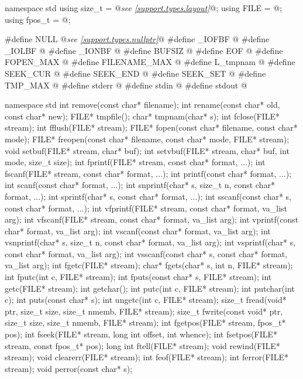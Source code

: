 \begin{codeblock}
namespace std {
  using size_t = @\textit{see \ref{support.types.layout}}@;
  using FILE = @\seebelow@;
  using fpos_t = @\seebelow@;
}

#define NULL @\textit{see \ref{support.types.nullptr}}@
#define _IOFBF @\seebelow@
#define _IOLBF @\seebelow@
#define _IONBF @\seebelow@
#define BUFSIZ @\seebelow@
#define EOF @\seebelow@
#define FOPEN_MAX @\seebelow@
#define FILENAME_MAX @\seebelow@
#define L_tmpnam @\seebelow@
#define SEEK_CUR @\seebelow@
#define SEEK_END @\seebelow@
#define SEEK_SET @\seebelow@
#define TMP_MAX @\seebelow@
#define stderr @\seebelow@
#define stdin @\seebelow@
#define stdout @\seebelow@

namespace std {
  int remove(const char* filename);
  int rename(const char* old, const char* new);
  FILE* tmpfile();
  char* tmpnam(char* s);
  int fclose(FILE* stream);
  int fflush(FILE* stream);
  FILE* fopen(const char* filename, const char* mode);
  FILE* freopen(const char* filename, const char* mode, FILE* stream);
  void setbuf(FILE* stream, char* buf);
  int setvbuf(FILE* stream, char* buf, int mode, size_t size);
  int fprintf(FILE* stream, const char* format, ...);
  int fscanf(FILE* stream, const char* format, ...);
  int printf(const char* format, ...);
  int scanf(const char* format, ...);
  int snprintf(char* s, size_t n, const char* format, ...);
  int sprintf(char* s, const char* format, ...);
  int sscanf(const char* s, const char* format, ...);
  int vfprintf(FILE* stream, const char* format, va_list arg);
  int vfscanf(FILE* stream, const char* format, va_list arg);
  int vprintf(const char* format, va_list arg);
  int vscanf(const char* format, va_list arg);
  int vsnprintf(char* s, size_t n, const char* format, va_list arg);
  int vsprintf(char* s, const char* format, va_list arg);
  int vsscanf(const char* s, const char* format, va_list arg);
  int fgetc(FILE* stream);
  char* fgets(char* s, int n, FILE* stream);
  int fputc(int c, FILE* stream);
  int fputs(const char* s, FILE* stream);
  int getc(FILE* stream);
  int getchar();
  int putc(int c, FILE* stream);
  int putchar(int c);
  int puts(const char* s);
  int ungetc(int c, FILE* stream);
  size_t fread(void* ptr, size_t size, size_t nmemb, FILE* stream);
  size_t fwrite(const void* ptr, size_t size, size_t nmemb, FILE* stream);
  int fgetpos(FILE* stream, fpos_t* pos);
  int fseek(FILE* stream, long int offset, int whence);
  int fsetpos(FILE* stream, const fpos_t* pos);
  long int ftell(FILE* stream);
  void rewind(FILE* stream);
  void clearerr(FILE* stream);
  int feof(FILE* stream);
  int ferror(FILE* stream);
  void perror(const char* s);
}
\end{codeblock}

